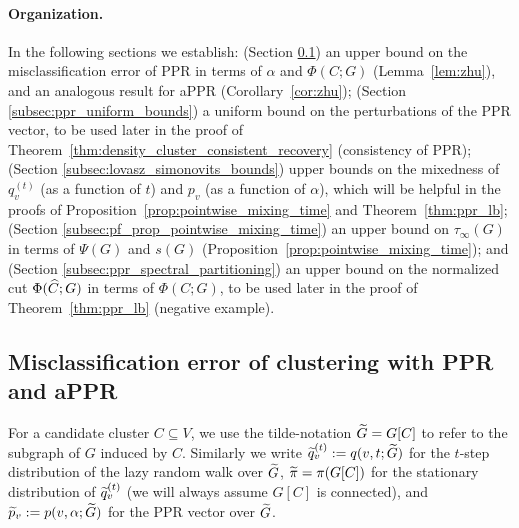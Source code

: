 \paragraph{Organization.} In the following sections we establish: (Section \ref{subsec:pf_lem_zhu}) an upper bound on the misclassification error of PPR in terms of $\alpha$ and $\Phi(C;G)$ (Lemma~\ref{lem:zhu}), and an analogous result for aPPR (Corollary~\ref{cor:zhu}); (Section \ref{subsec:ppr_uniform_bounds}) a uniform bound on the perturbations of the PPR vector, to be used later in the proof of Theorem~\ref{thm:density_cluster_consistent_recovery} (consistency of PPR);  (Section \ref{subsec:lovasz_simonovits_bounds}) upper bounds on the mixedness of $q_v^{(t)}$ (as a function of $t$) and $p_v$ (as a function of $\alpha$), which will be helpful in the proofs of Proposition~\ref{prop:pointwise_mixing_time} and Theorem~\ref{thm:ppr_lb}; (Section \ref{subsec:pf_prop_pointwise_mixing_time}) an upper bound on $\tau_{\infty}(G)$ in terms of $\Psi(G)$ and $s(G)$ (Proposition~\ref{prop:pointwise_mixing_time}); and (Section \ref{subsec:ppr_spectral_partitioning}) an upper bound on the normalized cut $\Phi(\widehat{C};G)$ in terms of $\Phi(C;G)$, to be used later in the proof of Theorem~\ref{thm:ppr_lb} (negative example). 

\subsection{Misclassification error of clustering with PPR and aPPR}
\label{subsec:pf_lem_zhu}
For a candidate cluster $C \subseteq V$, we use the tilde-notation $\widetilde{G} = G[C]$ to refer to the subgraph of $G$ induced by $C$. Similarly we write $\widetilde{q}_v^{(t)} := q(v,t;\widetilde{G})$ for the $t$-step distribution of the lazy random walk over $\widetilde{G}$, $\widetilde{\pi} = \pi(G[C])$ for the stationary distribution of $\widetilde{q}_v^{(t)}$ (we will always assume $G[C]$ is connected), and $\widetilde{p}_v := p(v,\alpha;\widetilde{G})$ for the PPR vector over $\widetilde{G}$.


